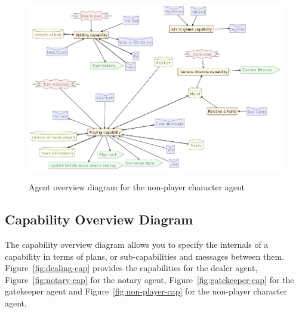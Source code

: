 \documentclass[a4paper]{article}
\begin{document}
\begin{figure}[htp]
  \includegraphics[keepaspectratio,scale=0.45]{pdt/images/detailed_design/non-player_character_overview_diagram.png}
  \label{fig:nonplay-char}
  \caption{Agent overview diagram for the non-player character agent}
\end{figure}
  

\subsection{Capability Overview Diagram}
The capability overview diagram allows you to specify the internals of a capability in terms of plans, or sub-capabilities and messages between them. Figure~\ref{fig:dealing-cap} provides the capabilities for the dealer agent, Figure~\ref{fig:notary-cap} for the notary agent, Figure~\ref{fig:gatekeeper-cap} for the gatekeeper agent and Figure~\ref{fig:non-player-cap} for the non-player character agent, 
\end{document}
